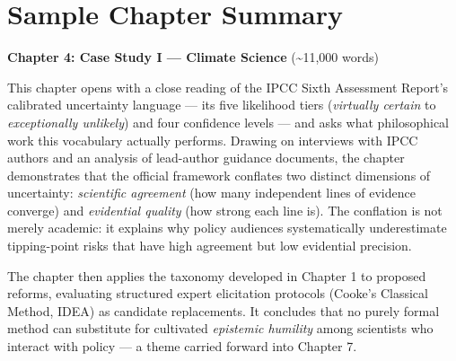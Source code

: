 \section{Sample Chapter Summary}

\textbf{Chapter 4: Case Study I — Climate Science} (\textasciitilde11,000 words)

This chapter opens with a close reading of the IPCC Sixth Assessment Report's calibrated uncertainty language — its five likelihood tiers (\textit{virtually certain} to \textit{exceptionally unlikely}) and four confidence levels — and asks what philosophical work this vocabulary actually performs. Drawing on interviews with IPCC authors and an analysis of lead-author guidance documents, the chapter demonstrates that the official framework conflates two distinct dimensions of uncertainty: \emph{scientific agreement} (how many independent lines of evidence converge) and \emph{evidential quality} (how strong each line is). The conflation is not merely academic: it explains why policy audiences systematically underestimate tipping-point risks that have high agreement but low evidential precision.

The chapter then applies the taxonomy developed in Chapter 1 to proposed reforms, evaluating structured expert elicitation protocols (Cooke's Classical Method, IDEA) as candidate replacements. It concludes that no purely formal method can substitute for cultivated \emph{epistemic humility} among scientists who interact with policy — a theme carried forward into Chapter 7.

